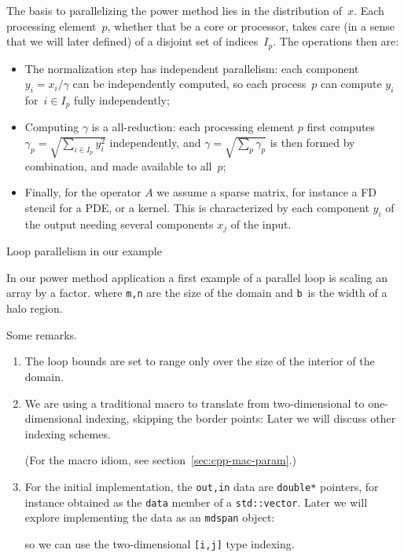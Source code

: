 The basis to parallelizing the power method lies in the distribution of~$x$.
Each processing element~$p$, whether that be a core or processor,
takes care (in a sense that we will later defined)
of a disjoint set of indices~$I_p$.
The operations then are:
\begin{itemize}
\item The normalization step has independent parallelism:
  each component $y_i=x_i/\gamma$ can be independently computed,
  so each process~$p$ can compute $y_i$ for~$i\in I_p$ fully independently;
\item Computing $\gamma$ is a all-reduction:
  each processing element $p$ first computes $\gamma_p=\sqrt{\sum_{i\in I_p}y_i^2}$
  independently,
  and $\gamma=\sqrt{\sum_p\gamma_p}$ is then formed by combination, and
  made available to all~$p$;
\item Finally, for the operator $A$ we assume a sparse matrix,
  for instance a \acf{FD} stencil for a \ac{PDE}, or a  kernel.
  This is characterized by each component $y_i$ of the output needing several
  components $x_j$ of the input.
\end{itemize}

 {Loop parallelism in our example}
\label{sec:d2d-omp1d}

In our power method application
a first example of a parallel loop is scaling an array by a factor.
%
%
where \lstinline{m,n} are the size of the domain and \lstinline{b}~is the
width of a halo region.


Some remarks.
\begin{enumerate}
\item
  The loop bounds are set to range only over the size of the interior of the domain.
\item We are using a traditional macro to translate from two-dimensional
  to one-dimensional indexing, skipping the border points:
  Later we will discuss other indexing schemes.
\begin{packt}
    (For the macro idiom, see section~\ref{sec:cpp-mac-param}.)
\end{packt}
\item
  For the initial implementation, the \lstinline{out,in} data
  are \lstinline{double*} pointers, for instance obtained
  as the \lstinline{data} member of a \lstinline{std::vector}.
  Later we will explore implementing the data as an \lstinline{mdspan} object:
  

  so we can use the two-dimensional \lstinline{[i,j]} type indexing.
\end{enumerate}

